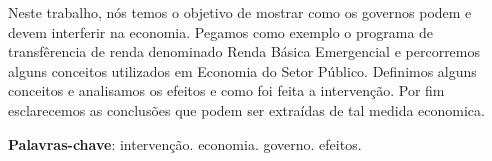\documentclass[
	article,			%
	11pt,				%
	oneside,			%
	a4paper,			%
	english,			%
	brazil,				%
	sumario=tradicional
	]{abntex2}
\begin{document}

\frenchspacing 


%
%

\maketitle




\begin{resumoumacoluna}
  Neste trabalho, nós temos o objetivo de mostrar como os governos podem e devem interferir na economia. Pegamos como exemplo o programa de transfêrencia de renda denominado Renda Básica Emergencial e percorremos alguns conceitos utilizados em Economia do Setor Público. Definimos alguns conceitos e analisamos os efeitos e como foi feita a intervenção. Por fim esclarecemos as conclusões que podem ser extraídas de tal medida economica.
 \vspace{\onelineskip}
 
 \noindent
 \textbf{Palavras-chave}: intervenção. economia. governo. efeitos.
\end{resumoumacoluna}



 

\end{document}
